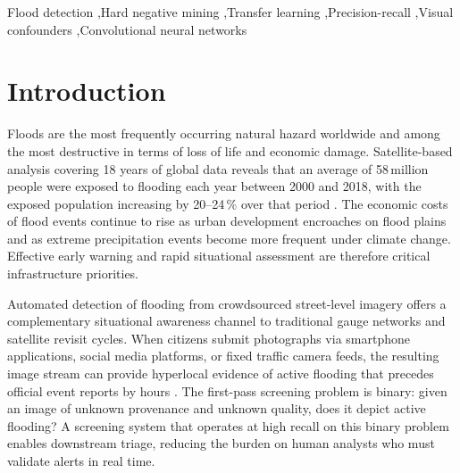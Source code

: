 \documentclass[a4paper,fleqn]{cas-sc}
\begin{document}
\begin{keywords}
Flood detection \sep Hard negative mining \sep Transfer learning \sep Precision-recall \sep Visual confounders \sep Convolutional neural networks
\end{keywords}

\maketitle 

\printcredits

\doublespacing


\section{Introduction}
\label{sec:intro}

Floods are the most frequently occurring natural hazard worldwide and among the
most destructive in terms of loss of life and economic damage.
Satellite-based analysis covering 18 years of global data reveals that an
average of 58\,million people were exposed to flooding each year between 2000
and 2018, with the exposed population increasing by 20--24\,\% over that period
\cite{Tellman2021}.
The economic costs of flood events continue to rise as urban development
encroaches on flood plains and as extreme precipitation events become more
frequent under climate change.
Effective early warning and rapid situational assessment are therefore critical
infrastructure priorities.

Automated detection of flooding from crowdsourced street-level imagery offers a
complementary situational awareness channel to traditional gauge networks and
satellite revisit cycles.
When citizens submit photographs via smartphone applications, social media
platforms, or fixed traffic camera feeds, the resulting image stream can
provide hyperlocal evidence of active flooding that precedes official event
reports by hours \cite{Esparza2022}.
The first-pass screening problem is binary: given an image of unknown provenance
and unknown quality, does it depict active flooding?
A screening system that operates at high recall on this binary problem enables
downstream triage, reducing the burden on human analysts who must validate
alerts in real time.
\end{document}
